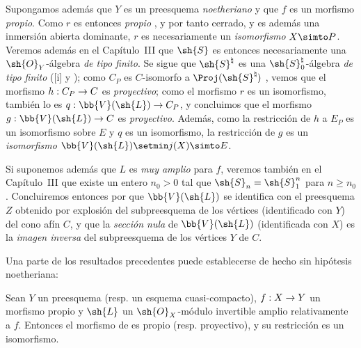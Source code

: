 \documentclass[oneside,10pt]{amsart}
\makeatletter
\renewcommand{\geq}{\geqslant}
\newcommand{\ega@arrow}[2]{\mathchoice{#1}{#2}{#2}{#2}}
\renewcommand{\to}{\ega@arrow{\longrightarrow}{\rightarrow}}
\let\EGAOriginalLabel\label
\renewcommand{\label}[1]{\phantomsection\EGAOriginalLabel{#1}}
\makeatother
\begin{document}
\begin{remark}[8.8.3]
\label{II.8.8.3}
Supongamos además que $Y$ es un preesquema \emph{noetheriano} y que $f$ es un morfismo \emph{propio}.
Como $r$ es entonces \emph{propio} , y por tanto cerrado, y es además una inmersión abierta dominante, $r$ es necesariamente un \emph{isomorfismo} $X\simto P$.
Veremos además en el Capítulo~III  que $\sh{S}$ es entonces necesariamente una $\sh{O}_Y$-álgebra \emph{de tipo finito}.
Se sigue que $\sh{S}^\natural$ es una $\sh{S}_0^\natural$-álgebra \emph{de tipo finito} ([i] y );
como $C_P$ es $C$-isomorfo a $\Proj(\sh{S}^\natural)$ , vemos que el morfismo $h:C_P\to C$ es \emph{proyectivo};
como el morfismo $r$ es un isomorfismo, también lo es $q:\bb{V}(\sh{L})\to C_P$, y concluimos que el morfismo $g:\bb{V}(\sh{L})\to C$ es \emph{proyectivo}.
Además, como la restricción de $h$ a $E_P$ es un isomorfismo sobre $E$ y $q$ es un isomorfismo, la restricción  de $g$ es un \emph{isomorfismo} $\bb{V}(\sh{L})\setmin j(X)\simto E$.

Si suponemos además que $L$ es \emph{muy amplio} para $f$, veremos también en el Capítulo~III  que existe un entero $n_0>0$ tal que $\sh{S}_n=\sh{S}_1^n$ para $n\geq n_0$.
Concluiremos entonces por  que $\bb{V}(\sh{L})$ se identifica con el preesquema $Z$ obtenido por explosión del subpreesquema de los vértices (identificado con $Y$) del cono afín $C$,
y que la \emph{sección nula} de $\bb{V}(\sh{L})$ (identificada con $X$) es la \emph{imagen inversa} del subpreesquema de los vértices $Y$ de $C$.

Una parte de los resultados precedentes puede establecerse de hecho sin hipótesis noetheriana:
\end{remark}
\begin{corollary}[8.8.4]
\label{II.8.8.4}
Sean $Y$ un preesquema \textup{(resp.} un esquema cuasi-compacto\textup{)}, $f:X\to Y$ un morfismo propio y $\sh{L}$ un $\sh{O}_X$-módulo invertible amplio relativamente a $f$.
Entonces el morfismo de  es propio \textup{(resp.} proyectivo\textup{)}, y su restricción  es un isomorfismo.
\end{corollary}
\end{document}
